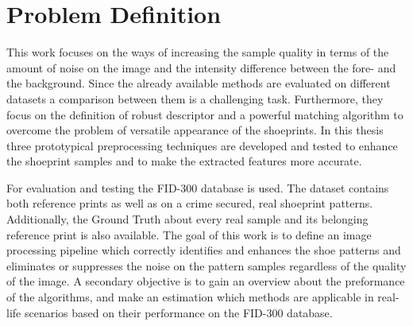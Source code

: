 \documentclass[draft,final]{vutinfth} %
\begin{document}
\section{Problem Definition}
\par
This work focuses on the ways of increasing the sample quality in terms of the amount of noise on the image and the intensity difference between the fore- and the background.
Since the already available methods are evaluated on different datasets a comparison between them is a challenging task.
Furthermore, they focus on the definition of robust descriptor and a powerful matching algorithm to overcome the problem of versatile appearance of the shoeprints.
In this thesis three prototypical preprocessing techniques are developed and tested to enhance the shoeprint samples and to make the extracted features more accurate. 
\par
For evaluation and testing the FID-300 database is used.
The dataset contains both reference prints as well as on a crime secured, real shoeprint patterns.
Additionally, the Ground Truth about every real sample and its belonging reference print is also available.
The goal of this work is to define an image processing pipeline which correctly identifies and enhances the shoe patterns and eliminates or suppresses the noise on the pattern samples regardless of the quality of the image.
A secondary objective is to gain an overview about the preformance of the algorithms, and make an estimation which methods are applicable in real-life scenarios based on their performance on the FID-300 database. 
\end{document}
